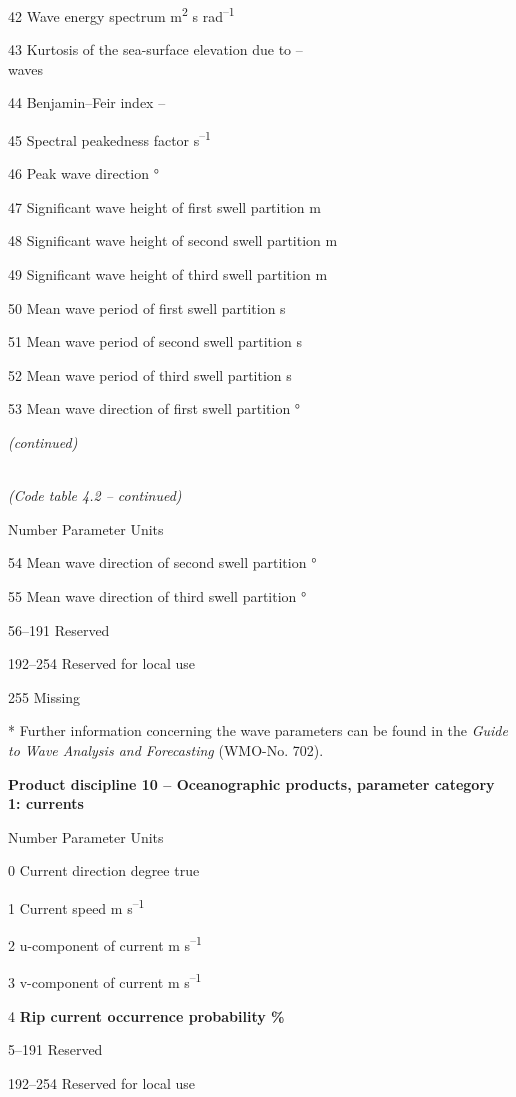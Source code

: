 42 Wave energy spectrum m\textsuperscript{2} s rad\textsuperscript{--1}

43 Kurtosis of the sea-surface elevation due to --\\
waves

44 Benjamin--Feir index --

45 Spectral peakedness factor s\textsuperscript{--1}

46 Peak wave direction °

47 Significant wave height of first swell partition m

48 Significant wave height of second swell partition m

49 Significant wave height of third swell partition m

50 Mean wave period of first swell partition s

51 Mean wave period of second swell partition s

52 Mean wave period of third swell partition s

53 Mean wave direction of first swell partition °

\emph{(continued)}

\emph{\\
(Code table 4.2 -- continued)}

Number Parameter Units

54 Mean wave direction of second swell partition °

55 Mean wave direction of third swell partition °

56--191 Reserved

192--254 Reserved for local use

255 Missing

* Further information concerning the wave parameters can be found in the \emph{Guide to Wave Analysis and Forecasting} (WMO-No. 702).

\textbf{Product discipline 10 -- Oceanographic products, parameter category 1: currents}

Number Parameter Units

0 Current direction degree true

1 Current speed m s\textsuperscript{--1}

2 u-component of current m s\textsuperscript{--1}

3 v-component of current m s\textsuperscript{--1}

4 \textbf{Rip current occurrence probability \%}

5--191 Reserved

192--254 Reserved for local use

